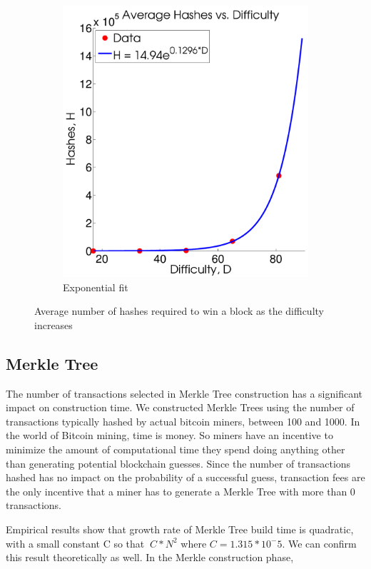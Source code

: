 \documentclass[pdftex,11pt]{article}
\begin{document}
\begin{figure}[H]
\begin{subfigure}[H]{0.4\textwidth}
		\includegraphics[width=\textwidth]{figures/Exp.pdf}
		\caption{Exponential fit}
	\end{subfigure}
	\caption{Average number of hashes required to win a block as the difficulty increases}
	\label{fig:hash}
\end{figure}

\subsection{Merkle Tree}
The number of transactions selected in Merkle Tree construction has a significant impact on construction time. We constructed Merkle Trees using the number of transactions typically hashed by actual bitcoin miners, between 100 and 1000. In the world of Bitcoin mining, time is money. So miners have an incentive to minimize the amount of computational time they spend doing anything other than generating potential blockchain guesses. Since the number of transactions hashed has no impact on the probability of a successful guess, transaction fees are the only incentive that a miner has to generate a Merkle Tree with more than 0 transactions. 

Empirical results show that growth rate of Merkle Tree build time is quadratic, with a small constant C so that  $~C*N^2$ where $C = 1.315*10^-5$. We can confirm this result theoretically as well. In the Merkle construction phase, 
\end{document}
